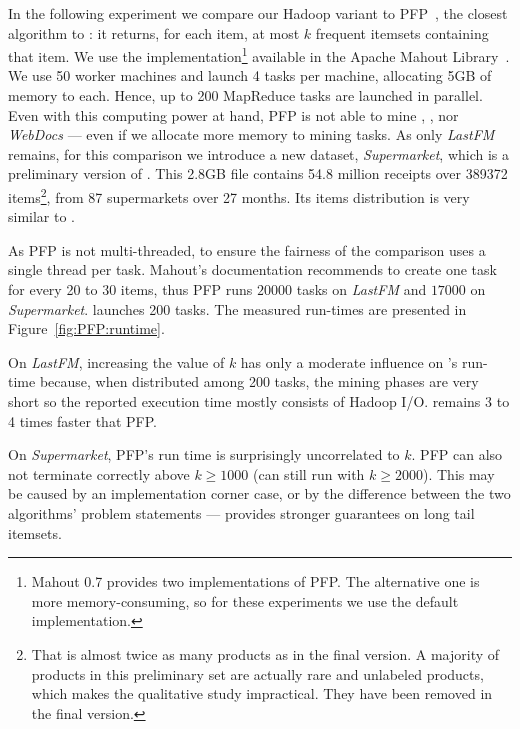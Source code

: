 In the following experiment we compare our Hadoop variant to PFP~\cite{LiRecSys08},
the closest algorithm to \toppi:
it returns, for each item, at most $k$ frequent itemsets containing that item.
We use the implementation\footnote{
Mahout 0.7 provides two implementations of PFP.
The alternative one is more memory-consuming, so for these experiments we
use the default implementation.
} available in the Apache Mahout Library~\cite{mahout}.
We use 50 worker machines and launch 4 tasks per machine, allocating 5GB of memory to each.
Hence, up to 200 MapReduce tasks are launched in parallel.
Even with this computing power at hand,
PFP is not able to mine \prodassocreceipt, \prodassocclient, nor {\em WebDocs}
--- even if we allocate more memory to mining tasks.
As only {\em LastFM} remains,
for this comparison we introduce a new dataset, \textit{Supermarket}, which is a preliminary version of \prodassocreceipt.
This 2.8GB file contains \num{54.8} million receipts
over \num{389372} items\footnote{That is almost twice as many products as in the final version.
A majority of products in this preliminary set are actually rare and unlabeled products,
which makes the qualitative study impractical. They have been removed in the final version.},
from 87 supermarkets over 27 months.
Its items distribution is very similar to \prodassocreceipt.

As PFP is not multi-threaded,
to ensure the fairness of the comparison
\toppi uses a single thread per task.
Mahout's documentation recommends to create one task for every 20 to 30 items,
thus PFP runs $\num{20000}$ tasks on \textit{LastFM}
and $\num{17000}$ on \textit{Supermarket}.
\toppi launches 200 tasks.
The measured run-times are presented in Figure~\ref{fig:PFP:runtime}.

On \textit{LastFM},
increasing the value of $k$ has only a moderate influence on \toppi's run-time because,
when distributed among 200 tasks, the mining phases are very short
so the reported execution time mostly consists of Hadoop I/O.
\toppi remains 3 to 4 times faster that PFP.

On \textit{Supermarket}, PFP's run time is surprisingly uncorrelated to $k$.
PFP can also not terminate correctly above $k \geq 1000$ (\toppi can still run with $k \geq 2000$).
This may be caused by an implementation corner case,
or by the difference between the two algorithms' problem statements ---
\toppi provides stronger guarantees on long tail itemsets.


